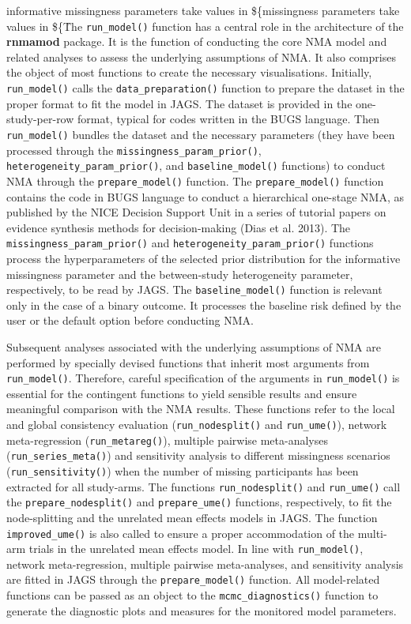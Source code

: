 informative missingness parameters take values in \$\{\rinformative missingness parameters take values in \$\{\r
The \texttt{run\_model()} function has a central role in the architecture of the \textbf{rnmamod}
package. It is the function of conducting the core NMA model and related analyses
to assess the underlying assumptions of NMA. It also comprises the object of most
functions to create the necessary visualisations. Initially, \texttt{run\_model()} calls
the \texttt{data\_preparation()} function to prepare the dataset in the proper format to
fit the model in JAGS. The dataset is provided in the one-study-per-row format,
typical for codes written in the BUGS language. Then \texttt{run\_model()} bundles the
dataset and the necessary parameters (they have been processed through the
\texttt{missingness\_param\_prior()}, \texttt{heterogeneity\_param\_prior()}, and \texttt{baseline\_model()}
functions) to conduct NMA through the \texttt{prepare\_model()} function. The \texttt{prepare\_model()}
function contains the code in BUGS language to conduct a hierarchical one-stage
NMA, as published by the NICE Decision Support Unit in a series of tutorial papers
on evidence synthesis methods for decision-making (Dias et al. 2013). The \texttt{missingness\_param\_prior()}
and \texttt{heterogeneity\_param\_prior()} functions process the hyperparameters of the
selected prior distribution for the informative missingness parameter and the
between-study heterogeneity parameter, respectively, to be read by JAGS.
The \texttt{baseline\_model()} function is relevant only in the case of a binary outcome.
It processes the baseline risk defined by the user or the default option before
conducting NMA.

Subsequent analyses associated with the underlying assumptions of NMA are performed
by specially devised functions that inherit most arguments from \texttt{run\_model()}.
Therefore, careful specification of the arguments in \texttt{run\_model()} is essential
for the contingent functions to yield sensible results and ensure meaningful
comparison with the NMA results. These functions refer to the local and global
consistency evaluation (\texttt{run\_nodesplit()} and \texttt{run\_ume()}), network meta-regression
(\texttt{run\_metareg()}), multiple pairwise meta-analyses (\texttt{run\_series\_meta()}) and
sensitivity analysis to different missingness scenarios (\texttt{run\_sensitivity()}) when
the number of missing participants has been extracted for all study-arms.
The functions \texttt{run\_nodesplit()} and \texttt{run\_ume()} call the \texttt{prepare\_nodesplit()} and
\texttt{prepare\_ume()} functions, respectively, to fit the node-splitting and the unrelated
mean effects models in JAGS. The function \texttt{improved\_ume()} is also called to ensure
a proper accommodation of the multi-arm trials in the unrelated mean effects model.
In line with \texttt{run\_model()}, network meta-regression, multiple pairwise meta-analyses,
and sensitivity analysis are fitted in JAGS through the \texttt{prepare\_model()} function.
All model-related functions can be passed as an object to the \texttt{mcmc\_diagnostics()}
function to generate the diagnostic plots and measures for the monitored model
parameters.

